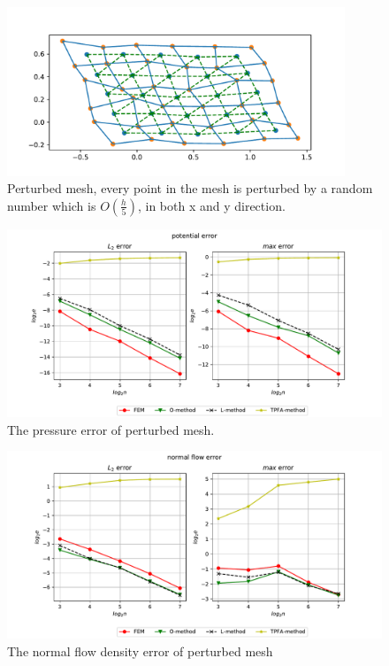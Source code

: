 \documentclass[../Main/main.tex]{subfiles}
\begin{document}
		\begin{figure}[H]
			\centering
			\includegraphics[width=0.9\textwidth]{mesh_perturbed.pdf}
			\caption{Perturbed mesh, every point in the mesh is perturbed by a random number which is $O(\frac{h}{5})$, in both x and y direction.}
			\label{fig:mesh_perturbed}
		\end{figure}
		\begin{figure}[H]
		\advance\leftskip-1cm
			\includegraphics[width=1.2\textwidth]{pressure_perturbed_1d1.pdf}
			\caption{The pressure error of perturbed mesh.}
			\label{fig:mesh_perturbed_potential}
		\end{figure}
		\begin{figure}[H]
		\advance\leftskip-1cm
			\includegraphics[width=1.2\textwidth]{flow_perturbed_1d1.pdf}
			\caption{The normal flow density error of perturbed mesh}
			\label{fig:mesh_perturbed_flow}
		\end{figure}
\end{document}
